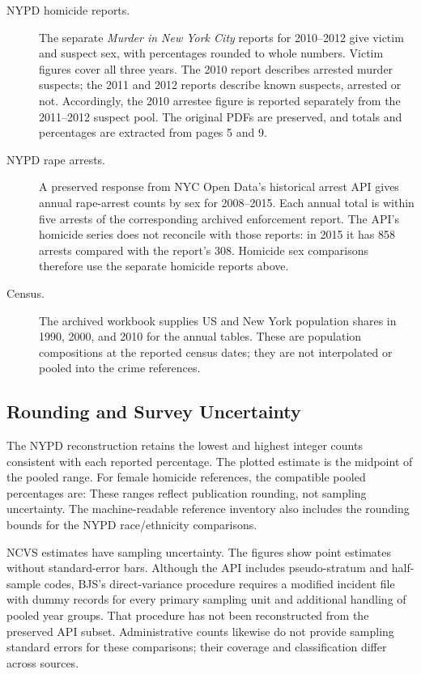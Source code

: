 \begin{description}
\item[NYPD homicide reports.] The separate \textit{Murder in New York City} reports for 2010--2012 give victim and suspect sex, with percentages rounded to whole numbers. Victim figures cover all three years. The 2010 report describes arrested murder suspects; the 2011 and 2012 reports describe known suspects, arrested or not. Accordingly, the 2010 arrestee figure is reported separately from the 2011--2012 suspect pool. The original PDFs are preserved, and totals and percentages are extracted from pages 5 and 9.

\item[NYPD rape arrests.] A preserved response from NYC Open Data's historical arrest API gives annual rape-arrest counts by sex for 2008--2015. Each annual total is within five arrests of the corresponding archived enforcement report. The API's homicide series does not reconcile with those reports: in 2015 it has 858 arrests compared with the report's 308. Homicide sex comparisons therefore use the separate homicide reports above.

\item[Census.] The archived workbook supplies US and New York population shares in 1990, 2000, and 2010 for the annual tables. These are population compositions at the reported census dates; they are not interpolated or pooled into the crime references.
\end{description}

\clearpage

\clearpage


\clearpage
\subsection*{Rounding and Survey Uncertainty}
The NYPD reconstruction retains the lowest and highest integer counts consistent with each reported percentage. The plotted estimate is the midpoint of the pooled range. For female homicide references, the compatible pooled percentages are:  These ranges reflect publication rounding, not sampling uncertainty. The machine-readable reference inventory also includes the rounding bounds for the NYPD race/ethnicity comparisons.

NCVS estimates have sampling uncertainty. The figures show point estimates without standard-error bars. Although the API includes pseudo-stratum and half-sample codes, BJS's direct-variance procedure requires a modified incident file with dummy records for every primary sampling unit and additional handling of pooled year groups. That procedure has not been reconstructed from the preserved API subset. Administrative counts likewise do not provide sampling standard errors for these comparisons; their coverage and classification differ across sources.

